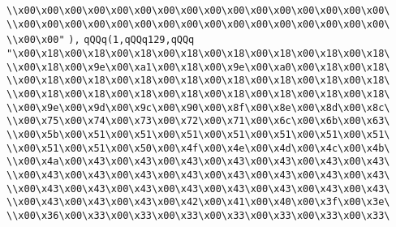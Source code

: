\verb|\\x00\x00\x00\x00\x00\x00\x00\x00\x00\x00\x00\x00\x00\x00\x00\x00\|\newline
\verb|\\x00\x00\x00\x00\x00\x00\x00\x00\x00\x00\x00\x00\x00\x00\x00\x00\|\newline
\verb|\\x00\x00"|\newline
\verb|),|\newline
\verb|qQQq(1,qQQq129,qQQq|\newline
\verb|"\x00\x18\x00\x18\x00\x18\x00\x18\x00\x18\x00\x18\x00\x18\x00\x18\|\newline
\verb|\\x00\x18\x00\x9e\x00\xa1\x00\x18\x00\x9e\x00\xa0\x00\x18\x00\x18\|\newline
\verb|\\x00\x18\x00\x18\x00\x18\x00\x18\x00\x18\x00\x18\x00\x18\x00\x18\|\newline
\verb|\\x00\x18\x00\x18\x00\x18\x00\x18\x00\x18\x00\x18\x00\x18\x00\x18\|\newline
\verb|\\x00\x9e\x00\x9d\x00\x9c\x00\x90\x00\x8f\x00\x8e\x00\x8d\x00\x8c\|\newline
\verb|\\x00\x75\x00\x74\x00\x73\x00\x72\x00\x71\x00\x6c\x00\x6b\x00\x63\|\newline
\verb|\\x00\x5b\x00\x51\x00\x51\x00\x51\x00\x51\x00\x51\x00\x51\x00\x51\|\newline
\verb|\\x00\x51\x00\x51\x00\x50\x00\x4f\x00\x4e\x00\x4d\x00\x4c\x00\x4b\|\newline
\verb|\\x00\x4a\x00\x43\x00\x43\x00\x43\x00\x43\x00\x43\x00\x43\x00\x43\|\newline
\verb|\\x00\x43\x00\x43\x00\x43\x00\x43\x00\x43\x00\x43\x00\x43\x00\x43\|\newline
\verb|\\x00\x43\x00\x43\x00\x43\x00\x43\x00\x43\x00\x43\x00\x43\x00\x43\|\newline
\verb|\\x00\x43\x00\x43\x00\x43\x00\x42\x00\x41\x00\x40\x00\x3f\x00\x3e\|\newline
\verb|\\x00\x36\x00\x33\x00\x33\x00\x33\x00\x33\x00\x33\x00\x33\x00\x33\|\newline
